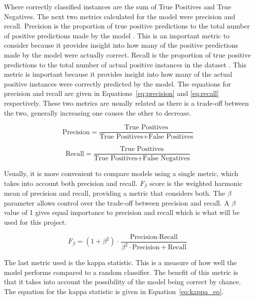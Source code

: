 Where correctly classified instances are the sum of True Positives and True Negatives. The next two metrics calculated for the model were precision and recall. Precision is the proportion of true positive predictions to the total number of positive predictions made by the model \cite{sokolovaSystematicAnalysisPerformance2009}. This is an important metric to consider because it provides insight into how many of the positive predictions made by the model were actually correct. Recall is the proportion of true positive predictions to the total number of actual positive instances in the dataset \cite{sokolovaSystematicAnalysisPerformance2009}. This metric is important because it provides insight into how many of the actual positive instances were correctly predicted by the model. The equations for precision and recall are given in Equations~\ref{eq:precision} and \ref{eq:recall} respectively. These two metrics are usually related as there is a trade-off between the two, generally increasing one causes the other to decrease.

\begin{equation}
    \label{eq:precision}
    \text{Precision} = \frac{\text{True Positives}}{\text{True Positives} + \text{False Positives}}
\end{equation}


\begin{equation}
    \label{eq:recall}
    \text{Recall} = \frac{\text{True Positives}}{\text{True Positives} + \text{False Negatives}}
\end{equation}


Usually, it is more convenient to compare models using a single metric, which takes into account both precision and recall. $F_{\beta}$ score is the weighted harmonic mean of precision and recall, providing a metric that considers both. The $\beta$ parameter allows control over the trade-off between precision and recall.  A $\beta$ value of 1 gives equal importance to precision and recall which is what will be used for this project. 

\begin{equation}
    \label{eq:f1}
    F_{\beta} = (1 + \beta^2) \cdot \frac{\text{Precision} \cdot \text{Recall}}{\beta^2 \cdot \text{Precision} + \text{Recall}}
\end{equation}

The last metric used is the kappa statistic. This is a measure of how well the model performs compared to a random classifier. The benefit of this metric is that it takes into account the possibility of the model being correct by chance. The equation for the kappa statistic is given in Equation~\ref{eq:kappa_eq}.

